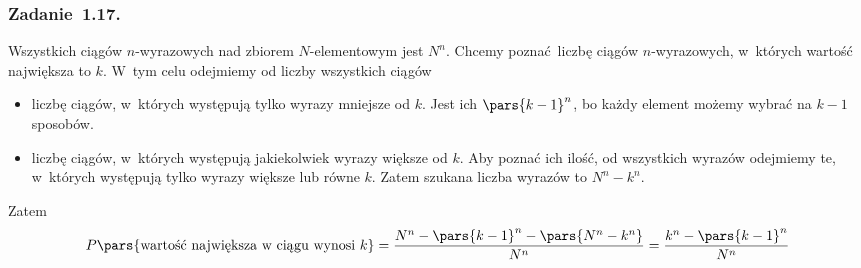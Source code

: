 \subsubsection*{Zadanie~1.17.}
Wszystkich ciągów \(n\)-wyrazowych nad zbiorem \(N\)-elementowym jest \(N^n\). Chcemy poznać liczbę ciągów \(n\)-wyrazowych, w~których wartość największa to \(k\). W~tym celu odejmiemy od liczby wszystkich ciągów
\begin{itemize}
    \item liczbę ciągów, w~których występują tylko wyrazy mniejsze od \(k\). Jest ich \(\pars{k - 1}^n\), bo każdy element możemy wybrać na \(k - 1\) sposobów.
    \item liczbę ciągów, w~których występują jakiekolwiek wyrazy większe od \(k\). Aby poznać ich ilość, od wszystkich wyrazów odejmiemy te, w~których występują tylko wyrazy większe lub równe \(k\). Zatem szukana liczba wyrazów to \(N^n - k^n\).
\end{itemize}
Zatem
\begin{equation*}
    P\pars{\text{wartość największa w~ciągu wynosi \(k\)}}
    = \frac{N^n - \pars{k - 1}^n - \pars{N^n - k^n}}{N^n}
    = \frac{k^n - \pars{k - 1}^n}{N^n}
\end{equation*}
